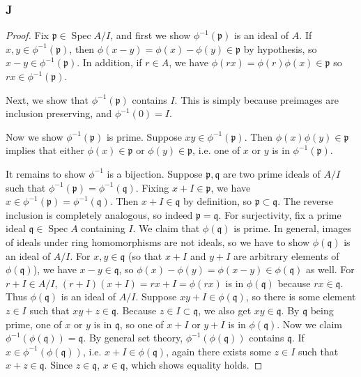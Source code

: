 \documentclass{article}
\newcommand{\frkp}{\mathfrak{p}}
\newcommand{\frkq}{\mathfrak{q}}
\DeclareMathOperator{\Spec}{\mathrm{Spec}}
\theoremstyle{definition} %
\begin{document}
\subsubsection{J}\label{3.2.J}
\begin{proof}
    Fix $\frkp \in \Spec A/I$, and first we show $\phi^{-1}(\frkp)$ is an ideal of $A$. If $x,y\in \phi^{-1}(\frkp)$, then $\phi(x-y)=\phi(x)-\phi(y)\in \frkp$ by hypothesis, so $x-y\in \phi^{-1}(\frkp)$. In addition, if $r\in A$, we have $\phi(rx)=\phi(r)\phi(x)\in \frkp$ so $rx\in \phi^{-1}(\frkp)$.

    Next, we show that $\phi^{-1}(\frkp)$ contains $I$. This is simply because preimages are inclusion preserving, and $\phi^{-1}(0)=I$.

    Now we show $\phi^{-1}(\frkp)$ is prime. Suppose $xy\in \phi^{-1}(\frkp)$. Then $\phi(x)\phi(y) \in \frkp$ implies that either $\phi(x)\in \frkp$ or $\phi(y)\in \frkp$, i.e. one of $x$ or $y$ is in $\phi^{-1}(\frkp)$.

    It remains to show $\phi^{-1}$ is a bijection. Suppose $\frkp, \frkq$ are two prime ideals of $A/I$ such that $\phi^{-1}(\frkp)=\phi^{-1}(\frkq)$. Fixing $x+I \in \frkp$, we have $x\in \phi^{-1}(\frkp)=\phi^{-1}(\frkq)$. Then $x+I\in \frkq$ by definition, so $\frkp\subset \frkq$. The reverse inclusion is completely analogous, so indeed $\frkp=\frkq$. For surjectivity, fix a prime ideal $\frkq\in \Spec A$ containing $I$. We claim that $\phi(\frkq)$ is prime. In general, images of ideals under ring homomorphisms are not ideals, so we have to show $\phi(\frkq)$ is an ideal of $A/I$. For $x,y\in \frkq$ (so that $x+I$ and $y+I$ are arbitrary elements of $\phi(\frkq)$), we have $x-y\in \frkq$, so $\phi(x)-\phi(y)=\phi(x-y)\in \phi(\frkq)$ as well. For $r+I\in A/I$, $(r+I)(x+I)=rx+I=\phi(rx)$ is in $\phi(\frkq)$ because $rx\in \frkq$. Thus $\phi(\frkq)$ is an ideal of $A/I$. Suppose $xy+I \in \phi(\frkq)$, so there is some element $z\in I$ such that $xy+z\in \frkq$. Because $z\in I\subset \frkq$, we also get $xy\in \frkq$. By $\frkq$ being prime, one of $x$ or $y$ is in $\frkq$, so one of $x+I$ or $y+I$ is in $\phi(\frkq)$. Now we claim $\phi^{-1}(\phi(\frkq))= \frkq$. By general set theory, $\phi^{-1}(\phi(\frkq))$ contains $\frkq$. If $x\in \phi^{-1}(\phi(\frkq))$, i.e. $x+I \in \phi(\frkq)$, again there exists some $z\in I$ such that $x+z\in \frkq$. Since $z\in \frkq$, $x\in \frkq$, which shows equality holds.
\end{proof}
\end{document}
